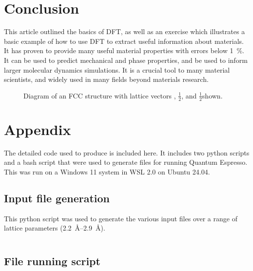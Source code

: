 \section{Conclusion}

This article outlined the basics of DFT, as well as an
exercise which illustrates a basic example of how to use DFT to extract useful
information about materials. It has proven to provide
many useful material properties with errors below \SI{1}{\percent}. It can be
used to predict mechanical and phase properties, and be used to inform
larger molecular dynamics simulations. It is a crucial tool to many material
scientists, and widely used in many fields beyond materials research.

\begin{figure}[b]
\centering

\caption{Diagram of an FCC structure with lattice vectors
\hkl[011], $\frac{1}{2}$\hkl[101], and $\frac{1}{2}$\hkl[110] shown.}
\label{fig:fcc}
\end{figure}

\printbibliography

\section{Appendix}
\label{sec:appendix}

The detailed code used to produce  is included
here. It includes
two python scripts and a bash script that were used to generate files for
running Quantum Espresso. This was run on a Windows 11 system in WSL 2.0
on Ubuntu 24.04.

\pagebreak

\subsection{Input file generation}

This python script was used to generate the various input files
over a range of lattice parameters (\SI{2.2}{\angstrom}--\SI{2.9}{\angstrom}).

\begin{tcolorbox}[colback=gray!10, colframe=gray!30, boxrule=0.5pt, breakable]
\begin{center}
  \inputminted[linenos,
  numbersep=8pt, fontsize=\small]{python}{./calculations/generate_files.py}
\end{center}
\end{tcolorbox}

\subsection{File running script}

